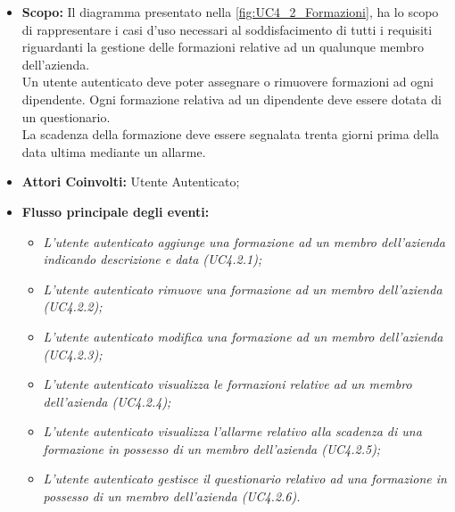 		\begin{itemize}
			\item \textbf{Scopo:} Il diagramma presentato nella \autoref{fig:UC4_2_Formazioni}, ha lo scopo di rappresentare i casi d'uso necessari al soddisfacimento di tutti i requisiti riguardanti la gestione delle formazioni relative ad un qualunque membro dell'azienda. \\ 
			Un utente autenticato deve poter assegnare o rimuovere formazioni ad ogni dipendente. 
			Ogni formazione relativa ad un dipendente deve essere dotata di un questionario. \\ 
			La scadenza della formazione deve essere segnalata trenta giorni prima della data ultima mediante un allarme.
			\item \textbf{Attori Coinvolti:} Utente Autenticato;
			\item \textbf{Flusso principale degli eventi:} 
			\begin{itemize}
				\item \textit{L'utente autenticato aggiunge una formazione ad un membro dell'azienda indicando descrizione e data (UC4.2.1);}
				\item \textit{L'utente autenticato rimuove una formazione ad un membro dell'azienda (UC4.2.2);}
				\item \textit{L'utente autenticato modifica una formazione ad un membro dell'azienda (UC4.2.3);}
				\item \textit{L'utente autenticato visualizza le formazioni relative ad un membro dell'azienda (UC4.2.4);}
				\item \textit{L'utente autenticato visualizza l'allarme relativo alla scadenza di una formazione in possesso di un membro dell'azienda (UC4.2.5);}
				\item \textit{L'utente autenticato gestisce il questionario relativo ad una formazione in possesso di un membro dell'azienda (UC4.2.6).}
			\end{itemize}
		\end{itemize}
	\newpage	
